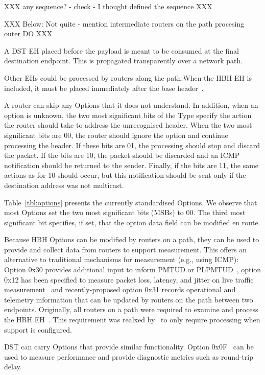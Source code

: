 \documentclass[conference]{IEEEtran}
\begin{document}
XXX any sequence? - check - I thought defined the sequence XXX 

XXX Below: Not quite - mention  intermediate routers on the path procesing outer DO XXX

A DST EH placed before the payload is meant to be consumed at the final destination endpoint. This is propagated transparently over a network path.

Other EHs could be processed by routers along the path.When the HBH EH is included, it must be placed immediately after the base header~\cite{RFC8200}.

A router can skip any Options that it does not understand. In addition, when an option is unknown, the two most significant bits of the Type
specify the action the router should take to address the unrecognised header. When the two most significant bits are 00, the router should
ignore the option and continue processing the header. If these bits are 01, the
processing should stop and discard the packet. If the bits are 10,
the packet should be discarded and an ICMP notification should be returned to
the sender. Finally, if the bits are 11, the same actions as for 10 should occur,
but this notification should be sent only if the destination address was not multicast. 

Table~\ref{tbl:options} presents the currently standardised 
Options.  We observe that most Options set the two most significant bits
(MSBs) to 00.  The third most significant bit specifies, if set, that the option data field can be modified en route.

Because HBH Options can be modified by routers on a path, they can be used to provide and collect data from routers to support measurement. This offers an alternative to traditional mechanisms for measurement (e.g., using ICMP):
Option 0x30 provides additional input to inform  PMTUD or PLPMTUD~\cite{rfc9268}, option
0x12 has been specified to measure packet loss, latency, and jitter on live
traffic measurement~\cite{rfc9343} and recently-proposed option 0x31 records
operational and telemetry information that can be updated by routers on the
path between two endpoints. 
Originally, all routers on a path were required to examine and process the HBH EH~\cite{rfc2460}. This requirement was realxed by~\cite{RFC8200} to
only require processing when support is  configured.


DST can carry Options that provide similar functionality. Option 0x0F~\cite{rfc8250} can be used to measure performance and provide diagnostic metrics such as round-trip delay. 
\end{document}
